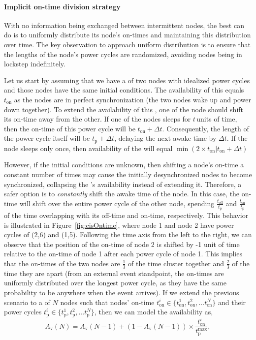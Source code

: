 \paragraph{Implicit on-time division strategy} 
With no information being exchanged between intermittent nodes, the best \sys can do is to uniformly distribute its node's on-times and maintaining this distribution over time. 
The key observation to approach uniform distribution is to ensure that the lengths of the node's power cycles are randomized, avoiding nodes being in lockstep indefinitely.

Let us start by assuming that we have a \sys of two nodes with idealized power cycles and those nodes have the same initial conditions. The availability of this \sys equals $t_\text{on}$ as the nodes are in perfect synchronization (the two nodes wake up and power down together). 
To extend the availability of this \sys, one of the node should
shift its on-time away from the other. If one of the nodes sleeps for $t$\,units of time, then the on-time of this power cycle will be $t_\text{on}+\Delta t$. Consequently, the length of the power cycle itself will be $t_\text{p} + \Delta t $, delaying the next awake time by $\Delta t$.
If the node sleeps only once, then availability of the \sys will equal $\min \left(2\times t_\text{on}| t_\text{on}+\Delta t\right)$

However, if the initial conditions are unknown, then shifting a node's on-time a constant number of times may cause the initially desynchronized nodes to become synchronized, collapsing the \sys's availability instead of extending it. Therefore, a safer option is to \emph{constantly} shift the awake time of the node. In this case, the on-time will shift over the entire power cycle of the other node, spending $\frac{ t_\text{off} }{t_\text{p}}$ and $\frac{ t_\text{on} }{t_\text{p}}$ of the time overlapping with its off-time and on-time, respectively. This behavior is illustrated in Figure~\ref{fig:cisOntime}, where node 1 and node 2 have power cycles of (2,6) and (1,5). Following the time axis from the left to the right, we can observe that the position of the on-time of node 2 is shifted by -1 unit of time relative to the on-time of node 1 after each power cycle of node 1. This implies that the on-times of the two nodes are $\frac{1}{3}$ of the time cluster together and $\frac{2}{3}$ of the time they are apart (from an external event standpoint, the on-times are uniformly distributed over the longest power cycle, as they have the same probability to be anywhere when the event arrives). 
%
If we extend the previous scenario to a \sys of $N$ nodes such that nodes' on-time $t_\text{on}^i \in \{ t_\text{on}^1,t_\text{on}^2,... t_\text{on}^N \}$ and their power cycles $t_\text{p}^i \in \{ t_\text{p}^1,t_\text{p}^2,\text{...} t_\text{p}^N \}$, then we can model the \sys availability as,
%	
\begin{equation}
	A_\text{v}(N) = A_\text{v}(N-1) + \left(1-A_\text{v}(N-1)\right) \times \frac{t_\text{on}^i}{t_\text{p}^\text{max}},
		\label{eq:cisModel}
\end{equation}

